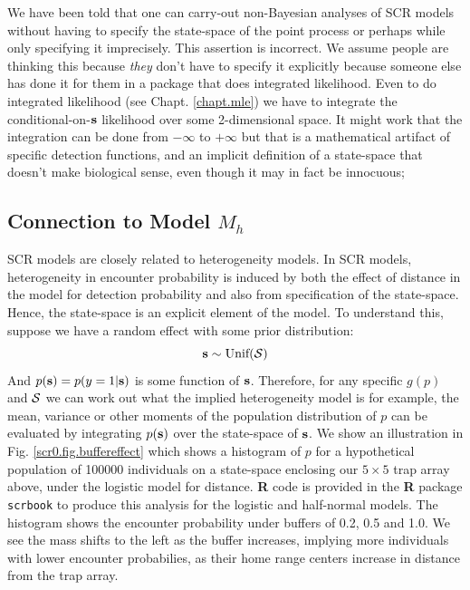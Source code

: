 We have been told that one can carry-out non-Bayesian analyses of SCR
models without having to specify the state-space of the point process
or perhaps while only specifying it imprecisely.  This assertion is
incorrect. We assume people are thinking this because {\it they} don't
have to specify it explicitly because someone else has done it for
them in a package that does integrated likelihood. Even to do
integrated likelihood (see Chapt. \ref{chapt.mle}) we have to integrate the
conditional-on-${\bf s}$ likelihood over some 2-dimensional space.  It might
work that the integration can be done from $-\infty$ to $+\infty$ but
that is a mathematical artifact of specific detection functions, and
an implicit definition of a state-space that doesn't make biological
sense, even though it may in fact be innocuous;


\subsection{Connection to Model  $M_h$}  \label{scr0.sec.scrmh}

SCR models are closely related to heterogeneity models. In SCR models,
heterogeneity in encounter probability is induced by both the effect
of distance in the model for detection probability and also from
specification of the state-space. Hence, the state-space  is an
explicit element of the model. 
To understand this, suppose we have a random
effect with some prior distribution:
\[
{\bf s} \sim \mbox{Unif}({\cal S})
\]
And $p({\bf s}) = p(y=1|{\bf s})$ is some function of ${\bf
  s}$. Therefore, for any specific $g(p)$ and ${\cal S}$ we can work
out what the implied heterogeneity model is for example, the mean,
variance or other moments of the population distribution of $p$ can be
evaluated by integrating $p({\bf s})$ over the state-space of ${\bf
  s}$.  We
show an illustration in Fig. \ref{scr0.fig.buffereffect} which
shows a histogram of $p$ for a hypothetical population of 100000
individuals on a state-space enclosing our $5 \times 5$ trap array
above, under the logistic model for distance. {\bf R} code is
provided in the {\bf R} package \mbox{\tt scrbook} to produce this analysis for the
logistic and half-normal models. The histogram shows the encounter
probability under buffers of 0.2, 0.5 and 1.0. We see the mass shifts
to the left as the buffer increases, implying more individuals
 with lower encounter probabilies, as their home range
centers increase in distance from the trap array.


